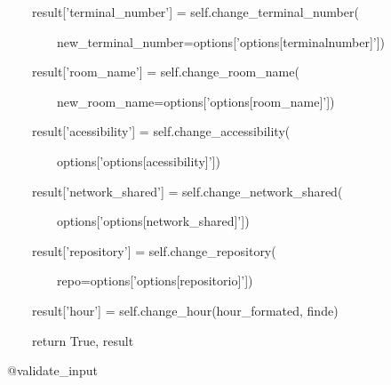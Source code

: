 {\ttfamily\color[rgb]{0.10980392,0.10980392,0.10980392}
    \ \ \ \ \ \ \ \ result['terminal\_number'] = self.change\_terminal\_number(}

            {\ttfamily\color[rgb]{0.10980392,0.10980392,0.10980392}
            \ \ \ \ \ \ \ \ \ \ \ \ new\_terminal\_number=options['options[terminalnumber]'])}


    \bigskip

{\ttfamily\color[rgb]{0.10980392,0.10980392,0.10980392}
    \ \ \ \ \ \ \ \ result['room\_name'] = self.change\_room\_name(}

            {\ttfamily\color[rgb]{0.10980392,0.10980392,0.10980392}
            \ \ \ \ \ \ \ \ \ \ \ \ new\_room\_name=options['options[room\_name]'])}


    \bigskip

{\ttfamily\color[rgb]{0.10980392,0.10980392,0.10980392}
    \ \ \ \ \ \ \ \ result['acessibility'] = self.change\_accessibility(}

            {\ttfamily\color[rgb]{0.10980392,0.10980392,0.10980392}
            \ \ \ \ \ \ \ \ \ \ \ \ options['options[acessibility]'])}


    \bigskip

{\ttfamily\color[rgb]{0.10980392,0.10980392,0.10980392}
    \ \ \ \ \ \ \ \ result['network\_shared'] = self.change\_network\_shared(}

            {\ttfamily\color[rgb]{0.10980392,0.10980392,0.10980392}
            \ \ \ \ \ \ \ \ \ \ \ \ options['options[network\_shared]'])}


    \bigskip

{\ttfamily\color[rgb]{0.10980392,0.10980392,0.10980392}
    \ \ \ \ \ \ \ \ result['repository'] = self.change\_repository(}

            {\ttfamily\color[rgb]{0.10980392,0.10980392,0.10980392}
            \ \ \ \ \ \ \ \ \ \ \ \ repo=options['options[repositorio]'])}


    \bigskip

{\ttfamily\color[rgb]{0.10980392,0.10980392,0.10980392}
    \ \ \ \ \ \ \ \ result['hour'] = self.change\_hour(hour\_formated, finde)}


    \bigskip

{\ttfamily\color[rgb]{0.10980392,0.10980392,0.10980392}
    \ \ \ \ \ \ \ \ return True, result}


    \bigskip

{\ttfamily\color[rgb]{0.10980392,0.10980392,0.10980392}
    \ \ \ \ @validate\_input}

